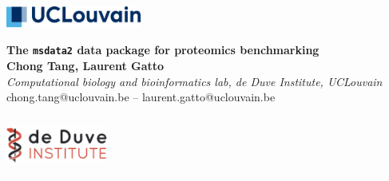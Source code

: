 \documentclass{article}
\title{}
\author{}
\date{}
\begin{document}


\begin{center}
  \colorbox{lgray}{
    \begin{minipage}[c]{3cm}
      \includegraphics[width=12em]{pix/ucllogo.png}
    \end{minipage}%

  \begin{minipage}{.74\textwidth}
    \begin{center}
      \huge \textbf{The \texttt{msdata2} data package for proteomics benchmarking} \\
      \vspace{0.4cm}
      \Large \textbf{Chong Tang, Laurent Gatto} \\
      \Large \textit{Computational biology and bioinformatics lab, de Duve Institute, UCLouvain } \\
      \vspace{0.4cm}
      \normalsize chong.tang@uclouvain.be -- laurent.gatto@uclouvain.be \\
    \end{center}
  \end{minipage}
  \begin{minipage}{5cm}
    \includegraphics[width=9em]{pix/Institut_de_Duve.png}
  \end{minipage}
}
\end{center}



\setlength{\columnsep}{1cm}
\end{document}
